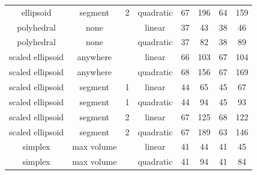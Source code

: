 \begin{center}
\begin{tabular}{ c c c c c c c c }
                ellipsoid &    segment &     2 &  quadratic &  67  &   196  &   64 &  159 \\
               polyhedral &       none &       &     linear &  37  &    43  &   38 &   46 \\
               polyhedral &       none &       &  quadratic &  37  &    82  &   38 &   89 \\
         scaled ellipsoid &   anywhere &       &     linear &  66  &   103  &   67 &  104 \\
         scaled ellipsoid &   anywhere &       &  quadratic &  68  &   156  &   67 &  169 \\
         scaled ellipsoid &    segment &     1 &     linear &  44  &    65  &   45 &   67 \\
         scaled ellipsoid &    segment &     1 &  quadratic &  44  &    94  &   45 &   93 \\
         scaled ellipsoid &    segment &     2 &     linear &  67  &   125  &   68 &  122 \\
         scaled ellipsoid &    segment &     2 &  quadratic &  67  &   189  &   63 &  146 \\
                  simplex & max volume &       &     linear &  41  &    44  &   41 &   45 \\
                  simplex & max volume &       &  quadratic &  41  &    94  &   41 &   84 \\


\end{tabular}
\end{center}
